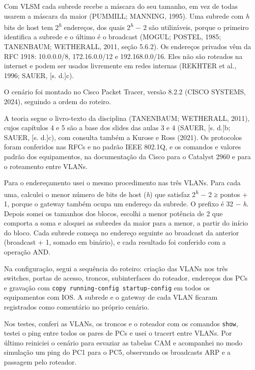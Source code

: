 
Com VLSM cada subrede recebe a máscara do seu tamanho, em vez de todas usarem a máscara da maior (PUMMILL; MANNING, 1995). Uma subrede com \textit{h} bits de host tem 2\textsuperscript{\textit{h}} endereços, dos quais 2\textsuperscript{\textit{h}} − 2 são utilizáveis, porque o primeiro identifica a subrede e o último é o broadcast (MOGUL; POSTEL, 1985; TANENBAUM; WETHERALL, 2011, seção 5.6.2). Os endereços privados vêm da RFC 1918: 10.0.0.0/8, 172.16.0.0/12 e 192.168.0.0/16. Eles não são roteados na internet e podem ser usados livremente em redes internas (REKHTER et al., 1996; SAUER, [s. d.]c).


O cenário foi montado no Cisco Packet Tracer, versão 8.2.2 (CISCO SYSTEMS, 2024), seguindo a ordem do roteiro.

A teoria segue o livro-texto da disciplina (TANENBAUM; WETHERALL, 2011), cujos capítulos 4 e 5 são a base dos slides das aulas 3 e 4 (SAUER, [s. d.]b; SAUER, [s. d.]c), com consulta também a Kurose e Ross (2021). Os protocolos foram conferidos nas RFCs e no padrão IEEE 802.1Q, e os comandos e valores padrão dos equipamentos, na documentação da Cisco para o Catalyst 2960 e para o roteamento entre VLANs.

Para o endereçamento usei o mesmo procedimento nas três VLANs. Para cada uma, calculei o menor número de bits de host (\textit{h}) que satisfaz 2\textsuperscript{\textit{h}} − 2 ≥ pontos + 1, porque o gateway também ocupa um endereço da subrede. O prefixo é 32 − \textit{h}. Depois somei os tamanhos dos blocos, escolhi a menor potência de 2 que comporta a soma e aloquei as subredes da maior para a menor, a partir do início do bloco. Cada subrede começa no endereço seguinte ao broadcast da anterior (broadcast + 1, somado em binário), e cada resultado foi conferido com a operação AND.

Na configuração, segui a sequência do roteiro: criação das VLANs nos três switches, portas de acesso, troncos, subinterfaces do roteador, endereços dos PCs e gravação com \texttt{copy running-config startup-config} em todos os equipamentos com IOS. A subrede e o gateway de cada VLAN ficaram registrados como comentário no próprio cenário.

Nos testes, conferi as VLANs, os troncos e o roteador com os comandos \texttt{show}, testei o ping entre todos os pares de PCs e usei o tracert entre VLANs. Por último reiniciei o cenário para esvaziar as tabelas CAM e acompanhei no modo simulação um ping do PC1 para o PC5, observando os broadcasts ARP e a passagem pelo roteador.

